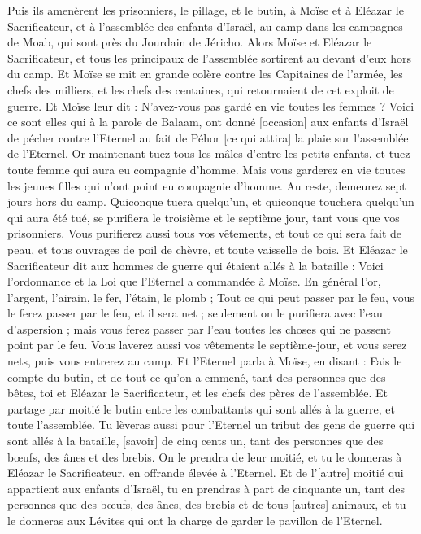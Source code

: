 \begin{multicols}{2}
Puis ils amenèrent les prisonniers, le pillage, et le butin, à Moïse et à Eléazar le Sacrificateur, et à l'assemblée des enfants d'Israël, au camp dans les campagnes de Moab, qui sont près du Jourdain de Jéricho.
Alors Moïse et Eléazar le Sacrificateur, et tous les principaux de l'assemblée sortirent au devant d'eux hors du camp.
Et Moïse se mit en grande colère contre les Capitaines de l'armée, les chefs des milliers, et les chefs des centaines, qui retournaient de cet exploit de guerre.
Et Moïse leur dit : N'avez-vous pas gardé en vie toutes les femmes ?
Voici ce sont elles qui à la parole de Balaam, ont donné [occasion] aux enfants d'Israël de pécher contre l'Eternel au fait de Péhor [ce qui attira] la plaie sur l'assemblée de l'Eternel.
Or maintenant tuez tous les mâles d'entre les petits enfants, et tuez toute femme qui aura eu compagnie d'homme.
Mais vous garderez en vie toutes les jeunes filles qui n'ont point eu compagnie d'homme.
Au reste, demeurez sept jours hors du camp. Quiconque tuera quelqu'un, et quiconque touchera quelqu'un qui aura été tué, se purifiera le troisième et le septième jour, tant vous que vos prisonniers.
Vous purifierez aussi tous vos vêtements, et tout ce qui sera fait de peau, et tous ouvrages de poil de chèvre, et toute vaisselle de bois.
Et Eléazar le Sacrificateur dit aux hommes de guerre qui étaient allés à la bataille : Voici l'ordonnance et la Loi que l'Eternel a commandée à Moïse.
En général l'or, l'argent, l'airain, le fer, l'étain, le plomb ;
Tout ce qui peut passer par le feu, vous le ferez passer par le feu, et il sera net ; seulement on le purifiera avec l'eau d'aspersion ; mais vous ferez passer par l'eau toutes les choses qui ne passent point par le feu.
Vous laverez aussi vos vêtements le septième-jour, et vous serez nets, puis vous entrerez au camp.
Et l'Eternel parla à Moïse, en disant :
Fais le compte du butin, et de tout ce qu'on a emmené, tant des personnes que des bêtes, toi et Eléazar le Sacrificateur, et les chefs des pères de l'assemblée.
Et partage par moitié le butin entre les combattants qui sont allés à la guerre, et toute l'assemblée.
Tu lèveras aussi pour l'Eternel un tribut des gens de guerre qui sont allés à la bataille, [savoir] de cinq cents un, tant des personnes que des bœufs, des ânes et des brebis.
On le prendra de leur moitié, et tu le donneras à Eléazar le Sacrificateur, en offrande élevée à l'Eternel.
Et de l'[autre] moitié qui appartient aux enfants d'Israël, tu en prendras à part de cinquante un, tant des personnes que des bœufs, des ânes, des brebis et de tous [autres] animaux, et tu le donneras aux Lévites qui ont la charge de garder le pavillon de l'Eternel.

\end{multicols}
